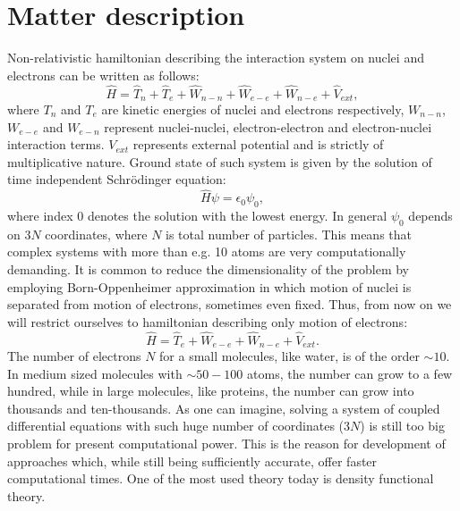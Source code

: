 \documentclass[openany, longbibliography,slovene,a4paper,12pt]{article}
\begin{document}
\section{Matter description}
Non-relativistic hamiltonian describing the interaction system on nuclei and electrons can be
written as follows:
\begin{equation} \label{full_hamiltonian}
\hat H= \hat T_n + \hat  T_e + \hat  W_{n-n} + \hat W_{e-e} + \hat W_{n-e} + \hat V_{ext},
\end{equation}
where $T_n$ and $T_e$ are kinetic energies of nuclei and electrons respectively,
$W_{n-n}$, $W_{e-e}$ and $W_{e-n}$ represent  nuclei-nuclei, electron-electron
and electron-nuclei interaction terms. $V_{ext}$ represents external potential
and is strictly of multiplicative nature.  Ground state of such system is given by the solution of time independent Schr{\"o}dinger equation:
\begin{equation} \label{ham_solution}
\hat H \psi = \epsilon_0 \psi_0,
\end{equation} 
where index $0$ denotes the solution with the lowest energy. In general $\psi_0$
depends on $3N$ coordinates, where $N$ is total number of particles. This means
that complex systems with more than e.g. 10 atoms are very computationally
demanding. It is common to reduce the dimensionality of the problem by employing
Born-Oppenheimer approximation in which motion of nuclei is separated from
motion of electrons, sometimes even fixed. Thus, from now on we will restrict
ourselves to hamiltonian describing only motion of electrons:
\begin{equation} \label{electron_hamiltonian}
\hat H=  \hat  T_e  + \hat W_{e-e} + \hat W_{n-e} + \hat V_{ext}.
\end{equation}
The number of electrons $N$ for a small molecules, like water, is of the order $\sim
10$. In medium sized molecules with $\sim 50-100$ atoms, the number can grow to a few
hundred, while in large molecules, like proteins, the number can grow into
thousands and ten-thousands. As one can imagine, solving a system of coupled differential equations
with such huge number of coordinates ($3N$) is still too big problem for present
computational power. This is the reason for development of approaches which,
while still being sufficiently accurate, offer faster computational times. One
of the most used theory today is density functional theory.
\end{document}
